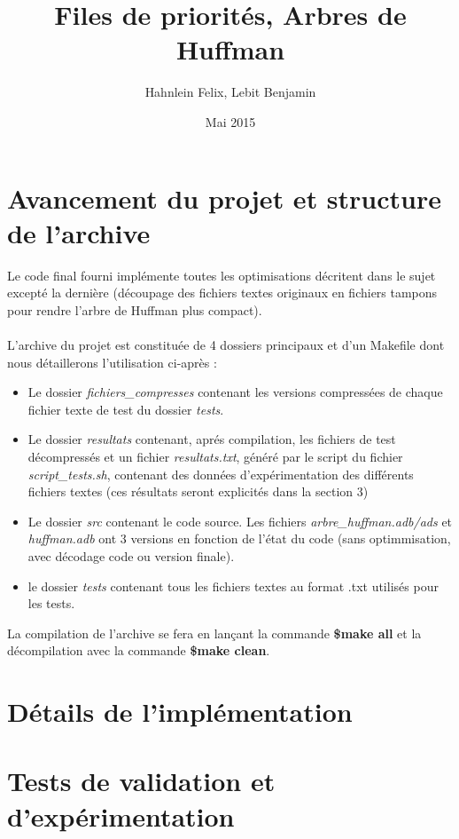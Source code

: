 \documentclass[a4paper,11pt]{article}
\title{Files de priorités, Arbres de Huffman}
\author{Hahnlein Felix, Lebit Benjamin}
\date{Mai 2015}
\begin{document}
\maketitle

\section{Avancement du projet et structure de l'archive}
Le code final fourni implémente toutes les optimisations décritent dans le sujet excepté la dernière (découpage des fichiers textes originaux en fichiers tampons pour rendre l'arbre de Huffman plus compact). \\\\
L'archive du projet est constituée de 4 dossiers principaux et d'un Makefile dont nous détaillerons l'utilisation ci-après :
\begin{itemize}
\item Le dossier \textit{fichiers\_compresses} contenant les versions compressées de chaque fichier texte de test du dossier \textit{tests}.
\item Le dossier \textit{resultats} contenant, aprés compilation, les fichiers de test décompressés et un fichier \textit{resultats.txt}, généré par le script du fichier\textit{ script\_tests.sh}, contenant des données d'expérimentation des différents fichiers textes (ces résultats seront explicités dans la section 3)
\item Le dossier \textit{src} contenant le code source. Les fichiers \textit{arbre\_huffman.adb/ads} et \textit{huffman.adb} ont 3 versions en fonction de l'état du code (sans optimmisation, avec décodage code ou version finale).
\item le dossier \textit{tests} contenant tous les fichiers textes au format .txt utilisés pour les tests.
\end{itemize}
La compilation de l'archive se fera en lançant la commande \scriptsize{\textbf{\$make all}} \normalsize{ et la décompilation avec la commande }\scriptsize{\textbf{\$make clean}}. \\
\section{Détails de l'implémentation}

\section{Tests de validation et d'expérimentation} 
\end{document}
